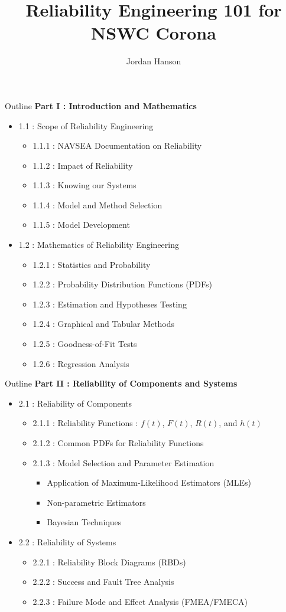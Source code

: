 \documentclass{beamer}
\title{Reliability Engineering 101 for NSWC Corona}
\author{Jordan Hanson}
\institute{Whittier College Department of Physics and Astronomy}
\begin{document}
\maketitle

\begin{frame}{Outline}
\small
\textbf{Part I : Introduction and Mathematics}
\begin{itemize}
\item 1.1 : Scope of Reliability Engineering
\begin{itemize}
\item 1.1.1 : NAVSEA Documentation on Reliability
\item 1.1.2 : Impact of Reliability
\item 1.1.3 : Knowing our Systems
\item 1.1.4 : Model and Method Selection
\item 1.1.5 : Model Development
\end{itemize}
\item 1.2 : Mathematics of Reliability Engineering
\begin{itemize}
\item 1.2.1 : Statistics and Probability
\item 1.2.2 : Probability Distribution Functions (PDFs)
\item 1.2.3 : Estimation and Hypotheses Testing
\item 1.2.4 : Graphical and Tabular Methods
\item 1.2.5 : Goodness-of-Fit Tests
\item 1.2.6 : Regression Analysis
\end{itemize}
\end{itemize}\end{frame}
\begin{frame}{Outline}
\small
\textbf{Part II : Reliability of Components and Systems}
\begin{itemize}
\item 2.1 : Reliability of Components
\begin{itemize}
\item 2.1.1 : Reliability Functions : $f(t)$, $F(t)$, $R(t)$, and $h(t)$
\item 2.1.2 : Common PDFs for Reliability Functions
\item 2.1.3 : Model Selection and Parameter Estimation
\begin{itemize}
\item Application of Maximum-Likelihood Estimators (MLEs)
\item Non-parametric Estimators
\item Bayesian Techniques
\end{itemize}
\end{itemize}
\item 2.2 : Reliability of Systems
\begin{itemize}
\item 2.2.1 : Reliability Block Diagrams (RBDs)
\item 2.2.2 : Success and Fault Tree Analysis
\item 2.2.3 : Failure Mode and Effect Analysis (FMEA/FMECA)
\end{itemize}
\end{itemize}
\end{frame}
\end{document}
